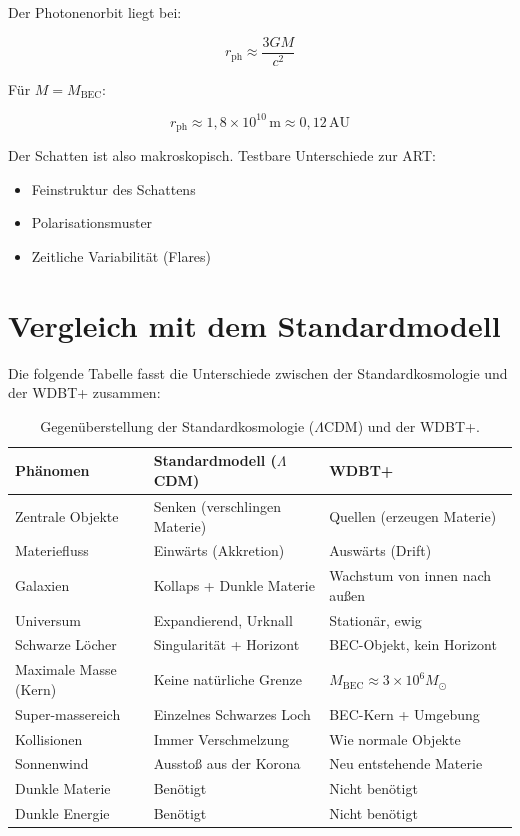Der Photonenorbit liegt bei:

\[
r_{\text{ph}} \approx \frac{3GM}{c^2}
\]

Für \( M = M_{\text{BEC}} \):

\[
r_{\text{ph}} \approx 1,8 \times 10^{10} \, \text{m} \approx 0,12 \, \text{AU}
\]

Der Schatten ist also makroskopisch. Testbare Unterschiede zur ART:

\begin{itemize}
    \item Feinstruktur des Schattens
    \item Polarisationsmuster
    \item Zeitliche Variabilität (Flares)
\end{itemize}

\section{Vergleich mit dem Standardmodell}
\label{sec:kosmo_vergleich}

Die folgende Tabelle fasst die Unterschiede zwischen der Standardkosmologie und der WDBT+ zusammen:

\begin{table}[htbp]
\centering
\caption{Gegenüberstellung der Standardkosmologie (\(\Lambda\)CDM) und der WDBT+.}
\begin{tabular}{lp{4.5cm}p{4.5cm}}
\hline
\textbf{Phänomen} & \textbf{Standardmodell (\(\Lambda\)CDM)} & \textbf{WDBT+} \\
\hline
Zentrale Objekte & Senken (verschlingen Materie) & Quellen (erzeugen Materie) \\
Materiefluss & Einwärts (Akkretion) & Auswärts (Drift) \\
Galaxien & Kollaps + Dunkle Materie & Wachstum von innen nach außen \\
Universum & Expandierend, Urknall & Stationär, ewig \\
Schwarze Löcher & Singularität + Horizont & BEC-Objekt, kein Horizont \\
Maximale Masse (Kern) & Keine natürliche Grenze & \( M_{\text{BEC}} \approx 3 \times 10^6 M_{\odot} \) \\
Super-massereich & Einzelnes Schwarzes Loch & BEC-Kern + Umgebung \\
Kollisionen & Immer Verschmelzung & Wie normale Objekte \\
Sonnenwind & Ausstoß aus der Korona & Neu entstehende Materie \\
Dunkle Materie & Benötigt & Nicht benötigt \\
Dunkle Energie & Benötigt & Nicht benötigt \\
\hline
\end{tabular}
\label{tab:kosmo_vergleich}
\end{table}

